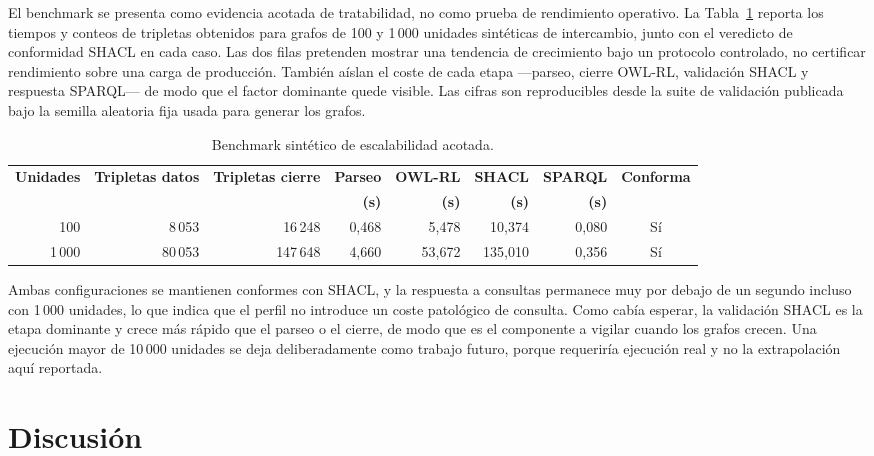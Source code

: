 \documentclass[Afour,sagev,times]{sagej}
\begin{document}
El benchmark se presenta como evidencia acotada de tratabilidad, no como prueba de rendimiento operativo. La Tabla~\ref{tab:scalability} reporta los tiempos y conteos de tripletas obtenidos para grafos de 100 y 1\,000 unidades sintéticas de intercambio, junto con el veredicto de conformidad SHACL en cada caso. Las dos filas pretenden mostrar una tendencia de crecimiento bajo un protocolo controlado, no certificar rendimiento sobre una carga de producción. También aíslan el coste de cada etapa ---parseo, cierre OWL-RL, validación SHACL y respuesta SPARQL--- de modo que el factor dominante quede visible. Las cifras son reproducibles desde la suite de validación publicada bajo la semilla aleatoria fija usada para generar los grafos.

\begin{table}[tb]
\scriptsize\sf\centering
\caption{Benchmark sintético de escalabilidad acotada.\label{tab:scalability}}
\begin{tabular}{@{}r r r r r r r c@{}}
\toprule
\textbf{Unidades} & \textbf{Tripletas datos} & \textbf{Tripletas cierre} & \textbf{Parseo} & \textbf{OWL-RL} & \textbf{SHACL} & \textbf{SPARQL} & \textbf{Conforma} \\
 & & & \textbf{(s)} & \textbf{(s)} & \textbf{(s)} & \textbf{(s)} & \\
\midrule
100 & 8\,053 & 16\,248 & 0,468 & 5,478 & 10,374 & 0,080 & Sí \\
1\,000 & 80\,053 & 147\,648 & 4,660 & 53,672 & 135,010 & 0,356 & Sí \\
\bottomrule
\end{tabular}
\end{table}

Ambas configuraciones se mantienen conformes con SHACL, y la respuesta a consultas permanece muy por debajo de un segundo incluso con 1\,000 unidades, lo que indica que el perfil no introduce un coste patológico de consulta. Como cabía esperar, la validación SHACL es la etapa dominante y crece más rápido que el parseo o el cierre, de modo que es el componente a vigilar cuando los grafos crecen. Una ejecución mayor de 10\,000 unidades se deja deliberadamente como trabajo futuro, porque requeriría ejecución real y no la extrapolación aquí reportada.

\section{Discusión}\label{sec:discussion}
\end{document}
